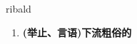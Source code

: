 
\begin{frame}
{\huge ribald}
\begin{center}
\begin{enumerate}\Large
  \item \textbf{(举止、言语)下流粗俗的}
\end{enumerate}
\end{center}
\end{frame}
